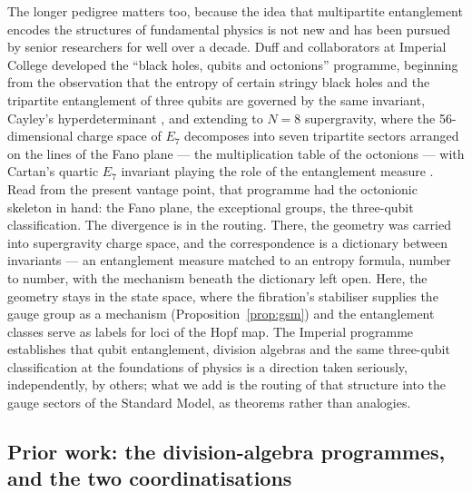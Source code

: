 The longer pedigree matters too, because the idea that multipartite entanglement encodes the
structures of fundamental physics is not new and has been pursued by senior researchers for well over
a decade. Duff and collaborators at Imperial College developed the ``black holes, qubits and
octonions'' programme, beginning from the observation that the entropy of certain stringy black holes
and the tripartite entanglement of three qubits are governed by the same invariant, Cayley's
hyperdeterminant \autocite{duff2007string}, and extending to $N=8$ supergravity, where the
56-dimensional charge space of $E_7$ decomposes into seven tripartite sectors arranged on the lines
of the Fano plane --- the multiplication table of the octonions --- with Cartan's quartic $E_7$
invariant playing the role of the entanglement measure
\autocite{dufferrara2007seven,levay2007fano,borsten2009blackholes}. Read from the present vantage
point, that programme had the octonionic skeleton in hand: the Fano plane, the exceptional groups,
the three-qubit classification. The divergence is in the routing. There, the geometry was carried
into supergravity charge space, and the correspondence is a dictionary between invariants --- an
entanglement measure matched to an entropy formula, number to number, with the mechanism beneath the
dictionary left open. Here, the geometry stays in the state space, where the fibration's stabiliser
supplies the gauge group as a mechanism (Proposition~\ref{prop:gsm}) and the entanglement classes
serve as labels for loci of the Hopf map. The Imperial programme establishes that qubit entanglement,
division algebras and the same three-qubit classification at the foundations of physics is a
direction taken seriously, independently, by others; what we add is the routing of that structure
into the gauge sectors of the Standard Model, as theorems rather than analogies.

\subsection{Prior work: the division-algebra programmes, and the two coordinatisations}
\label{sec:algebraic-dictionary}

